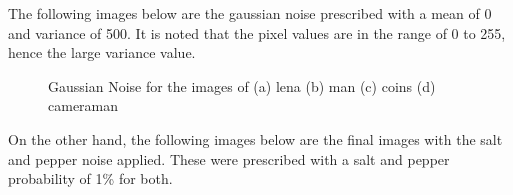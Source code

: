 \documentclass[conference]{IEEEtran}
\begin{document}
    The following images below are the gaussian noise prescribed with a mean of 0 and variance of 500. It is noted that the pixel values are in the range of 0 to 255, hence the large variance value.

    \begin{figure}[htbp]
        \centering
        \caption{Gaussian Noise for the images of (a) lena (b) man (c) coins (d) cameraman}
    \end{figure}

    On the other hand, the following images below are the final images with the salt and pepper noise applied. These were prescribed with a salt and pepper probability of 1\% for both.
\end{document}
